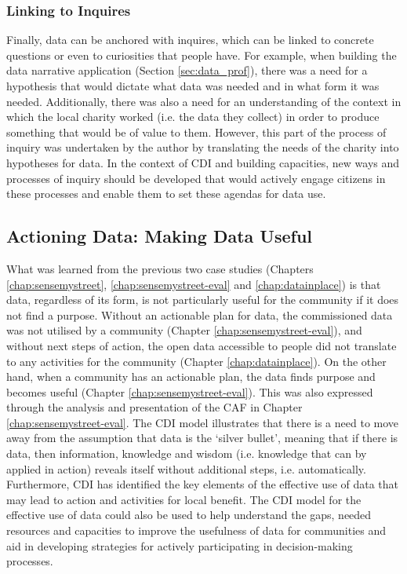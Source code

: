 \subsubsection{Linking to Inquires}
Finally, data can be anchored with inquires, which can be linked to concrete questions or even to curiosities that people have. For example, when building the data narrative application (Section \ref{sec:data_prof}), there was a need for a hypothesis that would dictate what data was needed and in what form it was needed. Additionally, there was also a need for an understanding of the context in which the local charity worked (i.e. the data they collect) in order to produce something that would be of value to them. However, this part of the process of inquiry was undertaken by the author by translating the needs of the charity into hypotheses for data. In the context of CDI and building capacities, new ways and processes of inquiry should be developed that would actively engage citizens in these processes and enable them to set these agendas for data use.

\subsection[Actioning Data]{Actioning Data: Making Data Useful}
What was learned from the previous two case studies (Chapters \ref{chap:sensemystreet}, \ref{chap:sensemystreet-eval} and \ref{chap:datainplace}) is that data, regardless of its form, is not particularly useful for the community if it does not find a purpose. Without an actionable plan for data, the commissioned data was not utilised by a community (Chapter \ref{chap:sensemystreet-eval}), and without next steps of action, the open data accessible to people did not translate to any activities for the community (Chapter \ref{chap:datainplace}). On the other hand, when a community has an actionable plan, the data finds purpose and becomes useful (Chapter \ref{chap:sensemystreet-eval}). This was also expressed through the analysis and presentation of the CAF in Chapter \ref{chap:sensemystreet-eval}. The CDI model illustrates that there is a need to move away from the assumption that data is the `silver bullet', meaning that if there is data, then information, knowledge and wisdom (i.e. knowledge that can by applied in action) reveals itself without additional steps, i.e. automatically. Furthermore, CDI has identified the key elements of the effective use of data that may lead to action and activities for local benefit. The CDI model for the effective use of data could also be used to help understand the gaps, needed resources and capacities to improve the usefulness of data for communities and aid in developing strategies for actively participating in decision-making processes.

